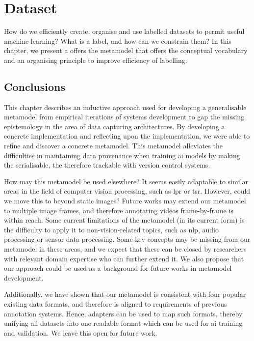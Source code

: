 \chapter{Dataset}
\label{ch:dataset}

How do we efficiently create, organise and use labelled datasets to permit useful machine learning? What is a label, and how can we constrain them? In this chapter, we present a offers the metamodel that offers the conceptual vocabulary and an organising principle to improve efficiency of labelling.






\newpage
\section{Conclusions}

This chapter describes an inductive approach used for developing a generalisable metamodel from empirical iterations of systems development to gap the missing epistemology in the area of data capturing architectures. By developing a concrete implementation and reflecting upon the implementation, we were able to refine and discover a concrete metamodel. This metamodel alleviates the difficulties in maintaining data provenance when training \gls{ai} models by making the serialisable, the therefore trackable with version control systems.

How may this metamodel be used elsewhere? It seems easily adaptable to similar areas in the field of computer vision processing, such as \gls{lpr} or \gls{tsr}. However, could we move this to beyond static images? Future works may extend our metamodel to multiple image frames, and therefore annotating videos frame-by-frame is within reach. Some current limitations of the metamodel (in its current form) is the difficulty to apply it to non-vision-related topics, such as \gls{nlp}, audio processing or sensor data processing. Some key concepts may be missing from our metamodel in these areas, and we expect that these can be closed by researchers with relevant domain expertise who can further extend it. We also propose that our approach could be used as a background for future works in metamodel development.

Additionally, we have shown that our metamodel is consistent with four popular existing data formats, and therefore is aligned to requirements of previous annotation systems. Hence, adapters can be used to map such formats, thereby unifying all datasets into one readable format which can be used for \gls{ai} training and validation. We leave this open for future work.

